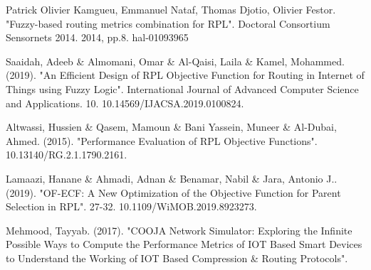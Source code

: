 \begin{thebibliography}{15}
 Patrick Olivier Kamgueu, Emmanuel Nataf, Thomas Djotio, Olivier Festor. "Fuzzy-based routing metrics combination for RPL". Doctoral Consortium Sensornets 2014. 2014, pp.8. hal-01093965

Saaidah, Adeeb \& Almomani, Omar \& Al-Qaisi, Laila \& Kamel, Mohammed. (2019). "An Efficient Design of RPL Objective Function for Routing in Internet of Things using Fuzzy Logic". International Journal of Advanced Computer Science and Applications. 10. 10.14569/IJACSA.2019.0100824.   

 Altwassi, Hussien \& Qasem, Mamoun \& Bani Yassein, Muneer \& Al-Dubai, Ahmed. (2015). "Performance Evaluation of RPL Objective Functions". 10.13140/RG.2.1.1790.2161.

 Lamaazi, Hanane \& Ahmadi, Adnan \& Benamar, Nabil \& Jara, Antonio J.. (2019). "OF-ECF: A New Optimization of the Objective Function for Parent Selection in RPL". 27-32. 10.1109/WiMOB.2019.8923273. 

 Mehmood, Tayyab. (2017). "COOJA Network Simulator: Exploring the Infinite Possible Ways to Compute the Performance Metrics of IOT Based Smart Devices to Understand the Working of IOT Based Compression \& Routing Protocols".
\end{thebibliography}